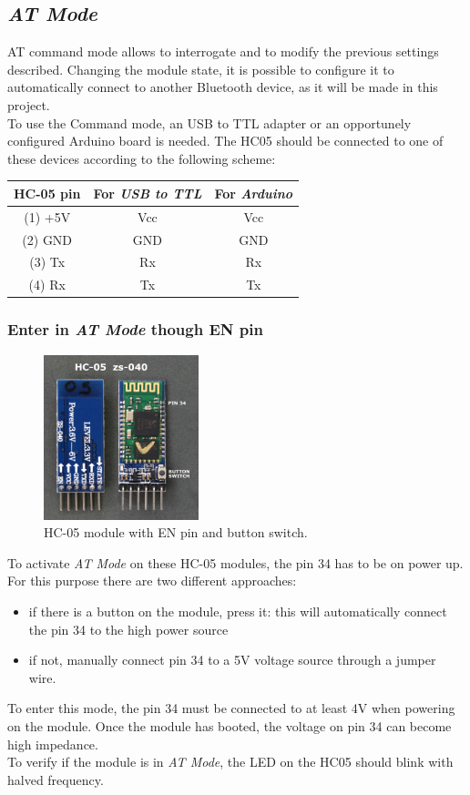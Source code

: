 \subsection{\textit{AT Mode}}
AT command mode allows to interrogate and to modify the previous settings described. Changing the module state, it is possible to configure it to automatically connect to another Bluetooth device, as it will be made in this project.\\
To use the Command mode, an USB to TTL adapter or an opportunely configured Arduino board is needed. The HC05 should be connected to one of these devices according to the following scheme:\\

\begin{tabular}{|c|c|c|}
	\hline 
	\textbf{HC-05 pin} & \textbf{For \textit{USB to TTL}} & \textbf{For \textit{Arduino}} \\ 
	\hline 
	(1) +5V & Vcc & Vcc \\ 
	\hline 
	(2) GND & GND & GND \\ 
	\hline 
	(3) Tx & Rx & Rx \\ 
	\hline 
	(4) Rx & Tx & Tx \\ 
	\hline 
\end{tabular}

\subsubsection{Enter in \textit{AT Mode} though EN pin}
\begin{figure}[H]
	\hspace*{0.3 \textwidth}\includegraphics[width= 0.4\textwidth]
	{files/images/hc05_en_pin}
	\caption{HC-05 module with EN pin and button switch.}
\end{figure}
To activate \textit{AT Mode} on these HC-05 modules, the pin 34 has to be on power up. For this purpose there are two different approaches: \begin{itemize}
\item if there is a button on the module, press it: this will automatically connect the pin 34 to the high power source
\item if not, manually connect pin 34 to a 5V voltage source through a jumper wire.
\end{itemize}
To enter this mode, the pin 34 must be connected to at least 4V when powering on the module. Once the module has booted, the voltage on pin 34 can become high impedance.\\
To verify if the module is in \textit{AT Mode}, the LED on the HC05 should blink with halved frequency.

